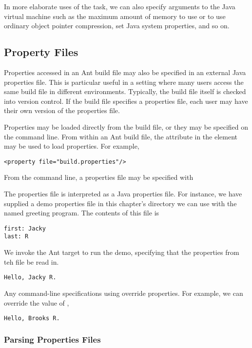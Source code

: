 In more elaborate uses of the  task, we can also specify
arguments to the Java virtual machine such as the maximum amount of
memory to use or to use ordinary object pointer compression, set Java
system properties, and so on.


\subsection{Property Files}

Properties accessed in an Ant build file may also be specified in an
external Java properties file.  This is particular useful in a setting
where many users access the same build file in different environments.
Typically, the build file itself is checked into version control.  If
the build file specifies a properties file, each user may have their
own version of the properties file.

Properties may be loaded directly from the build file, or they may be
specified on the command line.  From within an Ant build file, the
 attribute in the  element may be used to
load properties.  For example,
%
\begin{verbatim}
<property file="build.properties"/>
\end{verbatim}
%
From the command line, a properties file may be specified with
%

The properties file is interpreted as a Java properties file.  For
instance, we have supplied a demo properties file
 in this chapter's directory we can use with
the named greeting program.  The contents of this file is
%
\begin{verbatim}
first: Jacky
last: R
\end{verbatim}
%
We invoke the Ant target  to run the demo,
specifying that the properties from teh file 
be read in.
%
\begin{verbatim}
Hello, Jacky R.
\end{verbatim}
%
Any command-line specifications using  override properties.
For example, we can override the value of ,
%
\begin{verbatim}
Hello, Brooks R.
\end{verbatim}

\subsubsection{Parsing Properties Files}

